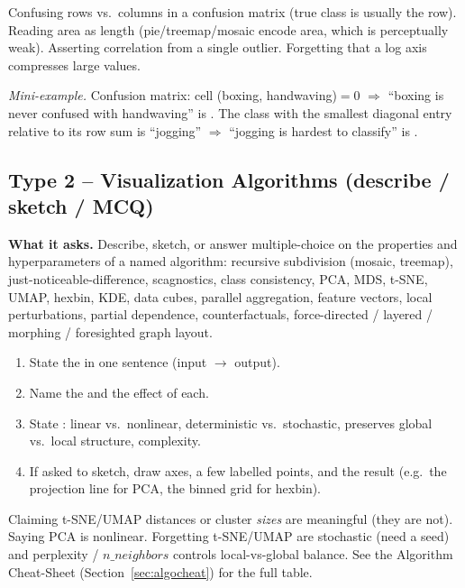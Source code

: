 \begin{pitfall}
Confusing rows vs.\ columns in a confusion matrix (true class is usually the
row). Reading area as length (pie/treemap/mosaic encode area, which is
perceptually weak). Asserting correlation from a single outlier. Forgetting
that a log axis compresses large values.
\end{pitfall}

\textit{Mini-example.} Confusion matrix: cell (boxing, handwaving)$=0$
$\Rightarrow$ ``boxing is never confused with handwaving'' is .
The class with the smallest diagonal entry relative to its row sum is
``jogging'' $\Rightarrow$ ``jogging is hardest to classify'' is .

\subsection{Type 2 -- Visualization Algorithms (describe / sketch / MCQ)}

\textbf{What it asks.} Describe, sketch, or answer multiple-choice on the
properties and hyperparameters of a named algorithm: recursive subdivision
(mosaic, treemap), just-noticeable-difference, scagnostics, class consistency,
PCA, MDS, t-SNE, UMAP, hexbin, KDE, data cubes, parallel aggregation, feature
vectors, local perturbations, partial dependence, counterfactuals,
force-directed / layered / morphing / foresighted graph layout.

\begin{exambox}
\begin{enumerate}[leftmargin=1.4em]
  \item State the  in one sentence (input $\to$ output).
  \item Name the  and the effect of each.
  \item State : linear vs.\ nonlinear, deterministic vs.\
        stochastic, preserves global vs.\ local structure, complexity.
  \item If asked to sketch, draw axes, a few labelled points, and the
        result (e.g.\ the projection line for PCA, the binned grid for hexbin).
\end{enumerate}
\end{exambox}

\begin{pitfall}
Claiming t-SNE/UMAP distances or cluster \emph{sizes} are meaningful (they are
not). Saying PCA is nonlinear. Forgetting t-SNE/UMAP are stochastic
(need a seed) and perplexity / $n\_neighbors$ controls local-vs-global balance.
See the Algorithm Cheat-Sheet (Section~\ref{sec:algocheat}) for the full table.
\end{pitfall}

